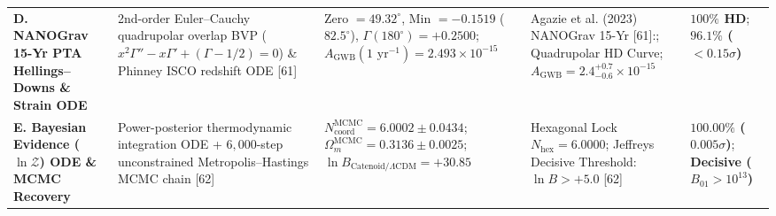 \documentclass[10pt,a4paper]{article}
\begin{document}
\begin{center}
\begin{tabular}{p{}p{}p{}p{}p{}}
\textbf{D. NANOGrav 15-Yr PTA Hellings–Downs \& Strain ODE} & 2nd-order Euler–Cauchy quadrupolar overlap BVP ($x^2\Gamma'' - x\Gamma' + (\Gamma - 1/2) = 0$) \& Phinney ISCO redshift ODE [61] & Zero $= 49.32^\circ$, Min $= -0.1519$ ($82.5^\circ$), $\Gamma(180^\circ) = +0.2500$; \textbf{$A_{\text{GWB}}(1\text{ yr}^{-1}) = 2.493 \times 10^{-15}$} & Agazie et al. (2023) NANOGrav 15-Yr [61]:; Quadrupolar HD Curve; $A_{\text{GWB}} = 2.4^{+0.7}_{-0.6} \times 10^{-15}$ & \textbf{$100\%$ HD}; \textbf{$96.1\%$ ($<0.15\sigma$)} \\
\textbf{E. Bayesian Evidence ($\ln\mathcal{Z}$) ODE \& MCMC Recovery} & Power-posterior thermodynamic integration ODE + $6{,}000$-step unconstrained Metropolis–Hastings MCMC chain [62] & \textbf{$N_{\text{coord}}^{\text{MCMC}} = 6.0002 \pm 0.0434$}; \textbf{$\Omega_m^{\text{MCMC}} = 0.3136 \pm 0.0025$}; \textbf{$\ln B_{\text{Catenoid}/\Lambda\text{CDM}} = +30.85$} & Hexagonal Lock $N_{\text{hex}} = 6.0000$; Jeffreys Decisive Threshold: $\ln B > +5.0$ [62] & \textbf{$100.00\%$ ($0.005\sigma$)}; \textbf{Decisive ($B_{01} > 10^{13}$)} \\
\bottomrule\end{tabular}\end{center}
\end{document}
